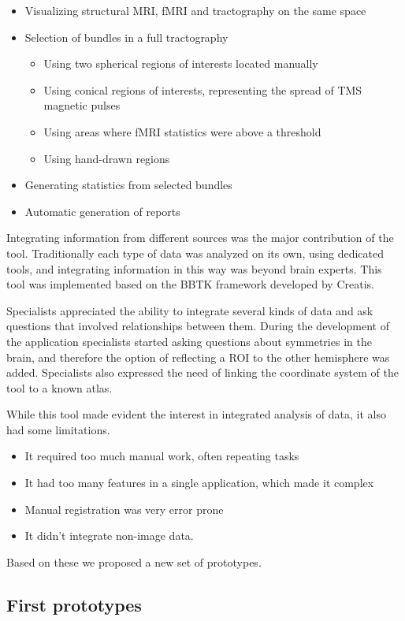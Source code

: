 \begin{itemize}
\item Visualizing structural MRI, fMRI and tractography on the same space
\item Selection of bundles in a full tractography
\begin{itemize}
\item Using two spherical regions of interests located manually
\item Using conical regions of interests, representing the spread of TMS magnetic pulses
\item Using areas where fMRI statistics were above a threshold
\item Using hand-drawn regions
\end{itemize}
\item Generating statistics from selected bundles
\item Automatic generation of reports
\end{itemize}

Integrating information from different sources was the major contribution of the tool. Traditionally each type of data was analyzed on its own, using dedicated tools, and integrating information in this way was beyond brain experts. This tool was implemented based on the BBTK framework \autocite{hoyos_creatools:_2012} developed by Creatis. 

Specialists appreciated the ability to integrate several kinds of data and ask questions that involved relationships between them. During the development of the application specialists started asking questions about symmetries in the brain, and therefore the option of reflecting a ROI to the other hemisphere was added. Specialists also expressed the need of linking the coordinate system of the tool to a known atlas.

While this tool made evident the interest in integrated analysis of data, it also had some limitations.
\begin{itemize}
\item It required too much manual work, often repeating tasks
\item It had too many features in a single application, which made it complex
\item Manual registration was very error prone
\item It didn't integrate non-image data.
\end{itemize}
Based on these we proposed a new set of prototypes.

\subsection{First prototypes}

